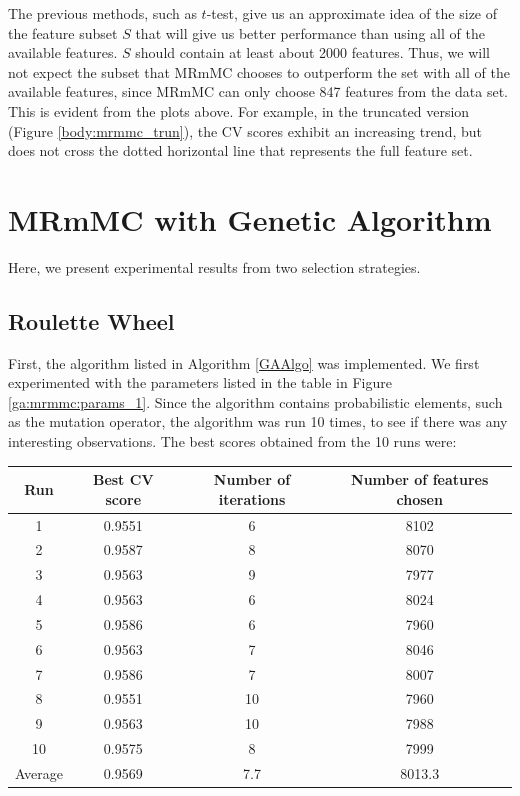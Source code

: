 \documentclass[12pt, twoside, a4paper]{report}
\begin{document}
The previous methods, such as $t$-test, give us an approximate idea of the size of the feature subset $S$ that will give us better performance than using all of the available features. $S$ should contain at least about 2000 features. Thus, we will not expect the subset that MRmMC chooses to outperform the set with all of the available features, since MRmMC can only choose 847 features from the data set. This is evident from the plots above. For example, in the truncated version (Figure \ref{body:mrmmc_trun}), the CV scores exhibit an increasing trend, but does not cross the dotted horizontal line that represents the full feature set.


\section{MRmMC with Genetic Algorithm} \label{mrmmc_ga_results}

Here, we present experimental results from two selection strategies.

\subsection{Roulette Wheel}

First, the algorithm listed in Algorithm \ref{GAAlgo} was implemented. We first experimented with the parameters listed in the table in Figure \ref{ga:mrmmc:params_1}. Since the algorithm contains probabilistic elements, such as the mutation operator, the algorithm was run 10 times, to see if there was any interesting observations. The best scores obtained from the 10 runs were:
\begin{center}
    \begin{tabular}{| c | c | c | c | } \hline
    Run & Best CV score & Number of iterations & Number of features chosen \\ \hline \hline
    1 & 0.9551 & 6 & 8102 \\ \hline
	2 & 0.9587 & 8 & 8070 \\ \hline
	3 & 0.9563 & 9 & 7977 \\ \hline
	4 & 0.9563 & 6 & 8024 \\ \hline
	5 & 0.9586 & 6 & 7960 \\ \hline
	6 & 0.9563 & 7 & 8046 \\ \hline
	7 & 0.9586 & 7 & 8007 \\ \hline
	8 & 0.9551 & 10 & 7960 \\ \hline
	9 & 0.9563 & 10 & 7988 \\ \hline
	10 & 0.9575 & 8 & 7999 \\ \hline
	Average & 0.9569 & 7.7 & 8013.3 \\ \hline
    \end{tabular}
\end{center}
\end{document}
